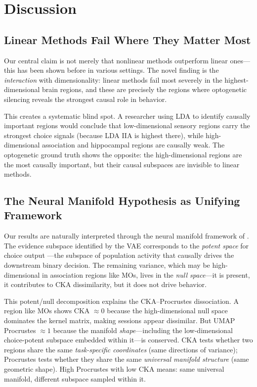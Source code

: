 \documentclass{article}
\begin{document}
\section{Discussion}

\subsection{Linear Methods Fail Where They Matter Most}

Our central claim is not merely that nonlinear methods outperform linear ones---this has been shown before in various settings. The novel finding is the \emph{interaction} with dimensionality: linear methods fail most severely in the highest-dimensional brain regions, and these are precisely the regions where optogenetic silencing reveals the strongest causal role in behavior.

This creates a systematic blind spot. A researcher using LDA to identify causally important regions would conclude that low-dimensional sensory regions carry the strongest choice signals (because LDA IIA is highest there), while high-dimensional association and hippocampal regions are causally weak. The optogenetic ground truth shows the opposite: the high-dimensional regions are the most causally important, but their causal subspaces are invisible to linear methods.

\subsection{The Neural Manifold Hypothesis as Unifying Framework}

Our results are naturally interpreted through the neural manifold framework of \citet{gallego2017neural}. The evidence subspace identified by the VAE corresponds to the \emph{potent space} for choice output \citep{kaufman2014cortical}---the subspace of population activity that causally drives the downstream binary decision. The remaining variance, which may be high-dimensional in association regions like MOs, lives in the \emph{null space}---it is present, it contributes to CKA dissimilarity, but it does not drive behavior.

This potent/null decomposition explains the CKA--Procrustes dissociation. A region like MOs shows CKA $\approx 0$ because the high-dimensional null space dominates the kernel matrix, making sessions appear dissimilar. But UMAP Procrustes $\approx 1$ because the manifold \emph{shape}---including the low-dimensional choice-potent subspace embedded within it---is conserved. CKA tests whether two regions share the same \emph{task-specific coordinates} (same directions of variance); Procrustes tests whether they share the same \emph{universal manifold structure} (same geometric shape). High Procrustes with low CKA means: same universal manifold, different subspace sampled within it.
\end{document}
